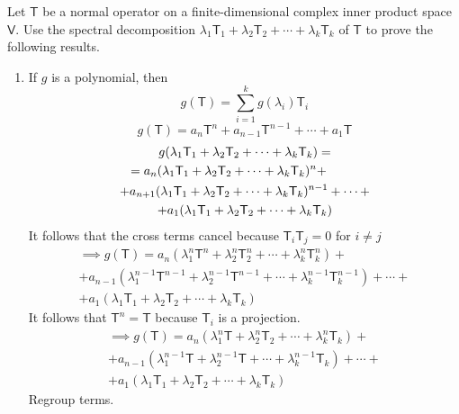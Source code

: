 Let $\mathsf{T}$ be a normal operator on a finite-dimensional complex
inner product space $\mathsf{V}.$ Use the spectral decomposition
$\lambda_1\mathsf{T}_1 + \lambda_2\mathsf{T}_2 + \dotsb +
\lambda_k\mathsf{T}_k$ of $\mathsf{T}$ to prove the following results.
\begin{enumerate}
\item If $g$ is a polynomial, then
\[
g(\mathsf{T}) = \sum\limits_{i=1}^k g(\lambda_i)\mathsf{T}_i
\]
\begin{equation}
g(\mathsf{T}) = a_n\mathsf{T}^n+a_{n-1}\mathsf{T}^{n-1} + \dotsb +
a_1\mathsf{T}
\end{equation}
\begin{multline}
g(\lambda_1\mathsf{T}_1 + \lambda_2\mathsf{T}_2 +\dotsb +
\lambda_k\mathsf{T}_k) = \\
\shoveleft{= a_n(\lambda_1\mathsf{T}_1 + \lambda_2\mathsf{T}_2 +\dotsb +
\lambda_k\mathsf{T}_k)^n +}\\+a_{n+1}(\lambda_1\mathsf{T}_1 + \lambda_2\mathsf{T}_2 +\dotsb+
\lambda_k\mathsf{T}_k)^{n-1} + \dotsb + \\
+ a_1(\lambda_1\mathsf{T}_1 + \lambda_2\mathsf{T}_2 +\dotsb +
\lambda_k\mathsf{T}_k)
\end{multline}
It follows that the cross terms cancel because
$\mathsf{T}_i\mathsf{T}_j = 0$ for $i\neq j$
\begin{multline}
\implies g(\mathsf{T}) = a_n\left(\lambda_1^n\mathsf{T}^n + \lambda_2^n\mathsf{T}_2^n+
\dotsb + \lambda_k^n\mathsf{T}^n_k\right) + \\
+ a_{n-1}\left(\lambda_1^{n-1}\mathsf{T}^{n-1} + \lambda_2^{n-1}\mathsf{T}^{n-1}
+ \dotsb + \lambda^{n-1}_k\mathsf{T}^{n-1}_k\right) + \dotsb +\\
+ a_1\left(\lambda_1\mathsf{T}_1 + \lambda_2\mathsf{T}_2 + \dotsb +
  \lambda_k\mathsf{T}_k\right)
\end{multline}
It follows that $\mathsf{T}^n = \mathsf{T}$ because $\mathsf{T}_i$ is a
projection.
\begin{multline}
\implies g(\mathsf{T}) = a_n\left(\lambda_1^n\mathsf{T} + \lambda_2^n\mathsf{T}_2+
\dotsb + \lambda_k^n\mathsf{T}_k\right) + \\
+ a_{n-1}\left(\lambda_1^{n-1}\mathsf{T} + \lambda_2^{n-1}\mathsf{T}
+ \dotsb + \lambda^{n-1}_k\mathsf{T}_k\right) + \dotsb +\\
+ a_1\left(\lambda_1\mathsf{T}_1 + \lambda_2\mathsf{T}_2 + \dotsb +
  \lambda_k\mathsf{T}_k\right)
\end{multline}
Regroup terms.
\begin{multline}

\end{multline}
\end{enumerate}

